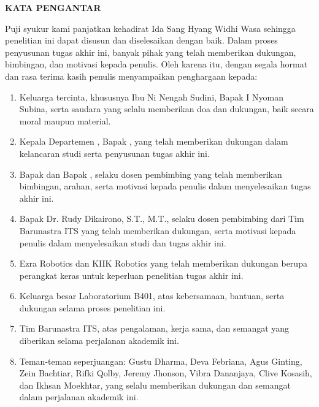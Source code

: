 \begin{center}
  \Large
  \textbf{KATA PENGANTAR}
\end{center}


\vspace{2ex}


Puji syukur kami panjatkan kehadirat Ida Sang Hyang Widhi Wasa  sehingga penelitian ini dapat disusun dan diselesaikan dengan baik. Dalam proses penyusunan tugas akhir ini, banyak pihak yang telah memberikan dukungan, bimbingan, dan motivasi kepada penulis. Oleh karena itu, dengan segala hormat dan rasa terima kasih  penulis menyampaikan penghargaan kepada:

\begin{enumerate}[nolistsep]
  \item Keluarga tercinta, khususnya Ibu Ni Nengah Sudini, Bapak I Nyoman Subina, serta saudara yang selalu memberikan doa dan dukungan, baik secara moral maupun material.
  \item Kepala Departemen \studyprogram{}, Bapak \headofdepartment{}, yang telah memberikan dukungan dalam kelancaran studi serta penyusunan tugas akhir ini.
  \item Bapak \advisor{} dan Bapak \coadvisor{}, selaku dosen pembimbing yang telah memberikan bimbingan, arahan, serta motivasi kepada penulis dalam menyelesaikan tugas akhir ini.
  \item Bapak Dr. Rudy Dikairono, S.T., M.T., selaku dosen pembimbing dari Tim Barunastra ITS yang telah memberikan dukungan, serta motivasi kepada penulis dalam menyelesaikan studi dan tugas akhir ini.
  \item Ezra Robotics dan KIIK Robotics yang telah memberikan dukungan berupa perangkat keras untuk keperluan penelitian tugas akhir ini.
  \item Keluarga besar Laboratorium B401, atas kebersamaan, bantuan, serta dukungan selama proses penelitian ini.
  \item Tim Barunastra ITS, atas pengalaman, kerja sama, dan semangat yang diberikan selama perjalanan akademik ini.
  \item Teman-teman seperjuangan: Gustu Dharma, Deva Febriana, Agus Ginting, Zein Bachtiar, Rifki Qolby, Jeremy Jhonson, Vibra Dananjaya, Clive Kosasih, dan Ikhsan Moekhtar, yang selalu memberikan dukungan dan semangat dalam perjalanan akademik ini.
\end{enumerate}

